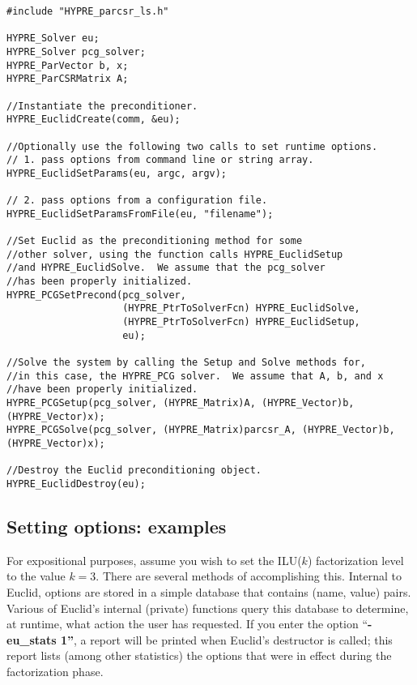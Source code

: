 \begin{display}
\begin{verbatim}
#include "HYPRE_parcsr_ls.h"

HYPRE_Solver eu;
HYPRE_Solver pcg_solver;
HYPRE_ParVector b, x;
HYPRE_ParCSRMatrix A;

//Instantiate the preconditioner.
HYPRE_EuclidCreate(comm, &eu);

//Optionally use the following two calls to set runtime options.
// 1. pass options from command line or string array.
HYPRE_EuclidSetParams(eu, argc, argv);

// 2. pass options from a configuration file.
HYPRE_EuclidSetParamsFromFile(eu, "filename");

//Set Euclid as the preconditioning method for some
//other solver, using the function calls HYPRE_EuclidSetup
//and HYPRE_EuclidSolve.  We assume that the pcg_solver
//has been properly initialized.
HYPRE_PCGSetPrecond(pcg_solver,
                    (HYPRE_PtrToSolverFcn) HYPRE_EuclidSolve,
                    (HYPRE_PtrToSolverFcn) HYPRE_EuclidSetup,
                    eu);

//Solve the system by calling the Setup and Solve methods for, 
//in this case, the HYPRE_PCG solver.  We assume that A, b, and x
//have been properly initialized.
HYPRE_PCGSetup(pcg_solver, (HYPRE_Matrix)A, (HYPRE_Vector)b, (HYPRE_Vector)x);
HYPRE_PCGSolve(pcg_solver, (HYPRE_Matrix)parcsr_A, (HYPRE_Vector)b, (HYPRE_Vector)x);

//Destroy the Euclid preconditioning object.
HYPRE_EuclidDestroy(eu);

\end{verbatim}
\end{display}


\subsection{Setting options: examples}

For expositional purposes, assume you wish to set the ILU($k$)
factorization level to the value $k = 3$.
There are several methods of accomplishing this.
Internal to Euclid, options are stored in a simple database that
contains (name, value) pairs.
Various of Euclid's internal (private) functions query this
database to determine, at runtime, what action the user
has requested.
If you enter the option ``{\bf -eu\_stats 1''}, a report will
be printed when Euclid's destructor is called; this
report lists (among other statistics) the options that
were in effect during the factorization phase.

